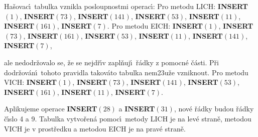 \documentclass[a4paper,12pt]{article}
\begin{document}
\flushpar Ha\v sovac\'\i\ tabulka vznikla posloupnostmi operac\'\i :\newline 
Pro metodu LICH:\newline 
{\bf INSERT$(1)$}, {\bf INSERT$(73)$}, {\bf INSERT$(141)$}, 
{\bf INSERT$(53)$}, {\bf INSERT$(11)$},\newline 
{\bf INSERT$(161)$}, {\bf INSERT$(7)$}.\newline 
Pro metodu EICH:\newline 
{\bf INSERT$(1)$}, {\bf INSERT$(73)$}, {\bf INSERT$(161)$}, 
{\bf INSERT$(53)$}, {\bf INSERT$(11)$},\newline 
{\bf INSERT$(141)$}, {\bf INSERT$(7)$},

\flushpar ale nedodr\v zovalo se, \v ze se nejd\v r\'\i v zapl\v nuj\'\i\ \v r\'adky z 
pomocn\'e \v c\'asti.  P\v ri dodr\v zov\'an\'\i\ tohoto pravidla takov\'ato tabulka 
nem\accent23u\v ze vznik\-nout.\newline 
Pro metodu VICH:\newline 
{\bf INSERT$(1)$}, {\bf INSERT$(73)$}, {\bf INSERT$(141)$}, 
{\bf INSERT$(53)$}, {\bf INSERT$(161)$},\newline 
{\bf INSERT$(11)$}, {\bf INSERT$(7)$}. 

\flushpar Aplikujeme operace {\bf INSERT$(28)$} a {\bf INSERT$(31
)$}, nov\'e \v r\'ad\-ky 
budou \v r\'adky \v c\'\i slo 4 a 9. Tabulka vytvo\v ren\'a pomoc\'\i\ 
metody LICH je na lev\'e stran\v e, metodou VICH je v 
prost\v redku a metodou EICH je na prav\'e stran\v e.
\end{document}
